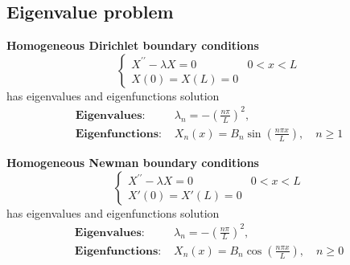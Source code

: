 \documentclass[10pt,leqno]{article}
\begin{document}
\begin{multicols}{2}

\subsection*{Eigenvalue problem}

\textbf{Homogeneous Dirichlet boundary conditions}
\begin{equation}
    \left\{
    \begin{array}{ll}
        X^{\prime \prime} - \lambda X =0 & 0<x<L \\
        X(0)= X(L) =0 &
    \end{array}
    \right.
    \label{equ:eig:zero}
\end{equation}
has eigenvalues and eigenfunctions solution
\begin{align}
    \textbf{Eigenvalues:\ } & \lambda_{n} = -\left( \frac{n\pi}{L}\right)^{2}, \\
    \textbf{Eigenfunctions:\ } & X_{n}(x) = B_{n}\sin\left( \frac{n\pi x}{L} \right), \quad  n\geq 1
\end{align}

\textbf{Homogeneous Newman boundary conditions}
\begin{equation}
    \left\{
    \begin{array}{ll}
        X^{\prime \prime} - \lambda X =0 & 0<x<L \\
        X'(0)= X'(L) =0 &
    \end{array}
    \right.
    \label{equ:eig:zeroder}
\end{equation}
has eigenvalues and eigenfunctions solution
\begin{align}
    \textbf{Eigenvalues:\ } & \lambda_{n} = -\left( \frac{n\pi}{L}\right)^{2}, \\
    \textbf{Eigenfunctions:\ } & X_{n}(x) = B_{n}\cos\left( \frac{n\pi x}{L} \right), \quad  n\geq 0
\end{align}



\end{multicols}
\end{document}
